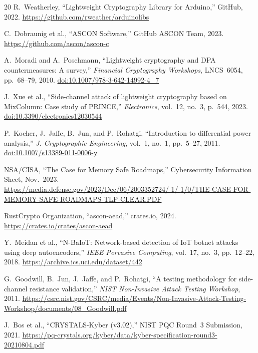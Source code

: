 \documentclass[anonymous]{ndss}
\begin{document}
\begin{thebibliography}{20}
R.~Weatherley, ``Lightweight Cryptography Library for Arduino,''
GitHub, 2022. \url{https://github.com/rweather/arduinolibs}

C.~Dobraunig et al., ``ASCON Software,'' GitHub ASCON Team, 2023.
\url{https://github.com/ascon/ascon-c}

A.~Moradi and A.~Poschmann, ``Lightweight cryptography and DPA
countermeasures: A survey,'' \textit{Financial Cryptography Workshops},
LNCS~6054, pp.~68--79, 2010.
\href{https://doi.org/10.1007/978-3-642-14992-4_7}{doi:10.1007/978-3-642-14992-4\_7}

J.~Xue et al., ``Side-channel attack of lightweight cryptography based
on MixColumn: Case study of PRINCE,''
\textit{Electronics}, vol.~12, no.~3, p.~544, 2023.
\href{https://doi.org/10.3390/electronics12030544}{doi:10.3390/electronics12030544}

P.~Kocher, J.~Jaffe, B.~Jun, and P.~Rohatgi,
``Introduction to differential power analysis,''
\textit{J. Cryptographic Engineering}, vol.~1, no.~1, pp.~5--27, 2011.
\href{https://doi.org/10.1007/s13389-011-0006-y}{doi:10.1007/s13389-011-0006-y}

NSA/CISA, ``The Case for Memory Safe Roadmaps,''
Cybersecurity Information Sheet, Nov.~2023.
\url{https://media.defense.gov/2023/Dec/06/2003352724/-1/-1/0/THE-CASE-FOR-MEMORY-SAFE-ROADMAPS-TLP-CLEAR.PDF}

RustCrypto Organization, ``ascon-aead,'' crates.io, 2024.
\url{https://crates.io/crates/ascon-aead}

Y.~Meidan et al., ``N-BaIoT: Network-based detection of IoT botnet
attacks using deep autoencoders,''
\textit{IEEE Pervasive Computing}, vol.~17, no.~3, pp.~12--22, 2018.
\url{https://archive.ics.uci.edu/dataset/442}

G.~Goodwill, B.~Jun, J.~Jaffe, and P.~Rohatgi,
``A testing methodology for side-channel resistance validation,''
\textit{NIST Non-Invasive Attack Testing Workshop}, 2011.
\url{https://csrc.nist.gov/CSRC/media/Events/Non-Invasive-Attack-Testing-Workshop/documents/08_Goodwill.pdf}

J.~Bos et al., ``CRYSTALS-Kyber (v3.02),''
NIST PQC Round~3 Submission, 2021.
\url{https://pq-crystals.org/kyber/data/kyber-specification-round3-20210804.pdf}

\end{thebibliography}
\end{document}
